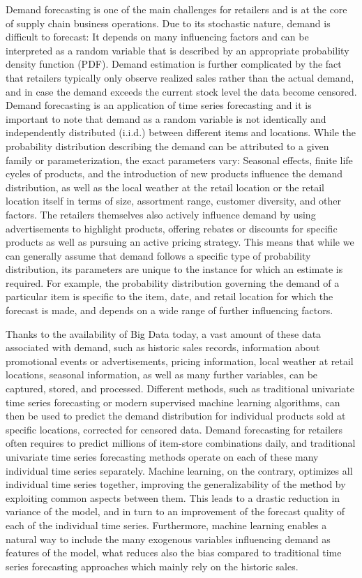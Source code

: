 \documentclass[BCOR=1mm, DIV=calc,10pt,
twoside=true,
twocolumn,
headings=normal]{scrartcl}
\begin{document}
Demand forecasting is one of the main challenges for retailers and is at the core of supply chain business operations. Due to its stochastic nature, demand is difficult to forecast: It depends on many influencing factors and can be interpreted as a random variable that is described by an appropriate probability density function (PDF). Demand estimation is further complicated by the fact that retailers typically only observe realized sales rather than the actual demand, and in case the demand exceeds the current stock level the data become censored. Demand forecasting is an application of time series forecasting and it is important to note that demand as a random variable is not identically and independently distributed (i.i.d.) between different items and locations. While the probability distribution describing the demand can be attributed to a given family or parameterization, the exact parameters vary: Seasonal effects, finite life cycles of products, and the introduction of new products influence the demand distribution, as well as the local weather at the retail location or the retail location itself in terms of size, assortment range, customer diversity, and other factors. The retailers themselves also actively influence demand by using advertisements to highlight products, offering rebates or discounts for specific products as well as pursuing an active pricing strategy. This means that while we can generally assume that demand follows a specific type of probability distribution, its parameters are unique to the instance for which an estimate is required. For example, the probability distribution governing the demand of a particular item is specific to the item, date, and retail location for which the forecast is made, and depends on a wide range of further influencing factors.

Thanks to the availability of Big Data today, a vast amount of these data associated with demand, such as historic sales records, information about promotional events or advertisements, pricing information, local weather at retail locations, seasonal information, as well as many further variables, can be captured, stored, and processed. Different methods, such as traditional univariate time series forecasting or modern supervised machine learning algorithms, can then be used to predict the demand distribution for individual products sold at specific locations, corrected for censored data. Demand forecasting for retailers often requires to predict millions of item-store combinations daily, and traditional univariate time series forecasting methods operate on each of these many individual time series separately. Machine learning, on the contrary, optimizes all individual time series together, improving the generalizability of the method by exploiting common aspects between them. This leads to a drastic reduction in variance of the model, and in turn to an improvement of the forecast quality of each of the individual time series. Furthermore, machine learning enables a natural way to include the many exogenous variables influencing demand as features of the model, what reduces also the bias compared to traditional time series forecasting approaches which mainly rely on the historic sales.
\end{document}

